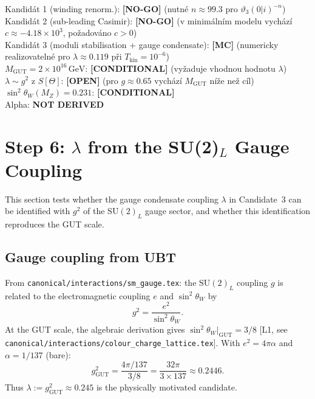 \documentclass[12pt,a4paper]{article}
\theoremstyle{remark}
\begin{document}
\begin{statusbox}
Kandidát 1 (winding renorm.): \textbf{[NO-GO]} (nutné $n\approx99.3$ pro $\vartheta_3(0|i)^{-n}$)\\
Kandidát 2 (sub-leading Casimir): \textbf{[NO-GO]} (v minimálním modelu vychází $c\approx-4.18\times10^3$, požadováno $c>0$)\\
Kandidát 3 (moduli stabilisation + gauge condensate): \textbf{[MC]} (numericky realizovatelné pro $\lambda\approx0.119$ při $T_{\mathrm{kin}}=10^{-6}$)\\
$M_{\mathrm{GUT}} = 2\times10^{16}\,\mathrm{GeV}$: \textbf{[CONDITIONAL]} (vyžaduje vhodnou hodnotu $\lambda$)\\
$\lambda \sim g^2$ z $S[\Theta]$: \textbf{[OPEN]} (pro $g\approx0.65$ vychází $M_{\mathrm{GUT}}$ níže než cíl)\\
$\sin^2\theta_W(M_Z) = 0.231$: \textbf{[CONDITIONAL]}\\
Alpha: \textbf{NOT DERIVED}
\end{statusbox}

\section{Step 6: $\lambda$ from the SU(2)$_L$ Gauge Coupling}
\label{sec:lambda_su2}

This section tests whether the gauge condensate coupling $\lambda$ in
Candidate~3 can be identified with $g^2$ of the $\mathrm{SU}(2)_L$ gauge
sector, and whether this identification reproduces the GUT scale.

\subsection{Gauge coupling from UBT}

From \texttt{canonical/interactions/sm\_gauge.tex}: the $\mathrm{SU}(2)_L$
coupling $g$ is related to the electromagnetic coupling $e$ and
$\sin^2\theta_W$ by
\[
g^2 = \frac{e^2}{\sin^2\theta_W}.
\]
At the GUT scale, the algebraic derivation gives
$\sin^2\theta_W\big|_{\mathrm{GUT}} = 3/8$ [L1, see
\texttt{canonical/interactions/colour\_charge\_lattice.tex}].
With $e^2 = 4\pi\alpha$ and $\alpha = 1/137$ (bare):
\[
g^2_{\mathrm{GUT}}
= \frac{4\pi/137}{3/8}
= \frac{32\pi}{3\times137}
\approx 0.2446.
\]
Thus $\lambda := g^2_{\mathrm{GUT}} \approx 0.245$ is the
physically motivated candidate.
\end{document}
